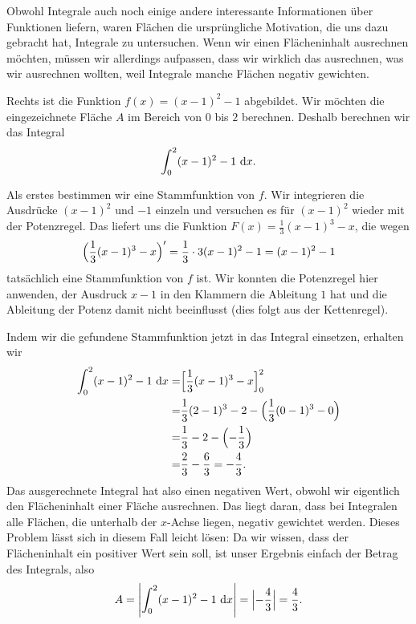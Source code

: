 \documentclass[../../main.tex]{subfiles}
\begin{document}
Obwohl Integrale auch noch einige andere interessante Informationen über Funktionen liefern, waren Flächen die 
ursprüngliche Motivation, die uns dazu gebracht hat, Integrale zu untersuchen. Wenn wir einen Flächeninhalt ausrechnen
möchten, müssen wir allerdings aufpassen, dass wir wirklich das ausrechnen, was wir ausrechnen wollten, weil Integrale
manche Flächen negativ gewichten.
\begin{example}{}
    Rechts ist die Funktion $f(x)=(x-1)^2-1$ abgebildet. Wir möchten die eingezeichnete Fläche $A$ im Bereich von $0$ bis $2$
    berechnen. Deshalb berechnen wir das Integral
    \[\int_0^2(x-1)^2-1\mathop{}\mathrm{d} x.\]

    Als erstes bestimmen wir eine Stammfunktion von $f$. Wir integrieren die Ausdrücke $(x-1)^2$ und $-1$ einzeln und
    versuchen es für $(x-1)^2$ wieder mit der Potenzregel. Das liefert uns die Funktion $F(x)=\frac{1}{3}(x-1)^3-x$, die
    wegen
    \[\Bigl(\frac{1}{3}(x-1)^3-x\Bigr)'=\frac{1}{3}\cdot 3(x-1)^2-1=(x-1)^2-1\] 
    tatsächlich eine Stammfunktion von $f$ ist. Wir konnten die Potenzregel hier anwenden, der Ausdruck $x-1$ in den
    Klammern die Ableitung $1$ hat und die Ableitung der Potenz damit nicht beeinflusst (dies folgt aus der Kettenregel).

    Indem wir die gefundene Stammfunktion jetzt in das Integral einsetzen, erhalten wir
    \begin{align*}
        \int_0^2(x-1)^2-1\mathop{}\mathrm{d} x=&\Bigl[\frac{1}{3}(x-1)^3-x\Bigr]_0^2\\
        =&\frac{1}{3}(2-1)^3-2-\Bigl(\frac{1}{3}(0-1)^3-0\Bigr)\\
        =&\frac{1}{3}-2-\Bigl(-\frac{1}{3}\Bigr)\\
        =&\frac{2}{3}-\frac{6}{3}=-\frac{4}{3}.
    \end{align*}
    Das ausgerechnete Integral hat also einen negativen Wert, obwohl wir eigentlich den Flächeninhalt einer Fläche
    ausrechnen.
    Das liegt daran, dass bei Integralen alle Flächen, die unterhalb der $x$-Achse liegen, negativ gewichtet werden.
    Dieses Problem lässt sich in diesem Fall leicht lösen: Da wir wissen, dass der Flächeninhalt ein positiver Wert
    sein soll, ist unser Ergebnis einfach der Betrag des Integrals, also
    \[A=\Biggl|\int_0^2(x-1)^2-1\mathop{}\mathrm{d} x\Biggr|=\Bigl|-\frac{4}{3}\Bigr|=\frac{4}{3}.\]
\end{example}
\end{document}
